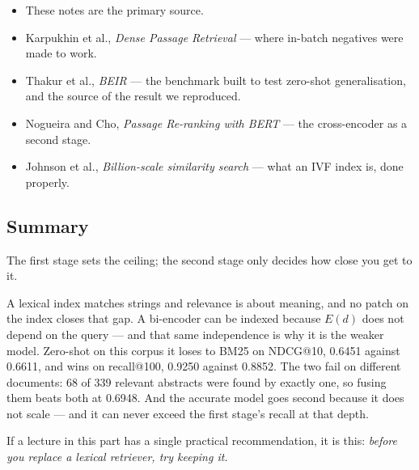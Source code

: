 \documentclass[11pt,a4paper]{article}
\begin{document}
\begin{itemize}[leftmargin=*,nosep]
  \item These notes are the primary source.
  \item Karpukhin et al., \emph{Dense Passage Retrieval} --- where in-batch
        negatives were made to work.
  \item Thakur et al., \emph{BEIR} --- the benchmark built to test zero-shot
        generalisation, and the source of the result we reproduced.
  \item Nogueira and Cho, \emph{Passage Re-ranking with BERT} --- the
        cross-encoder as a second stage.
  \item Johnson et al., \emph{Billion-scale similarity search} --- what an IVF
        index is, done properly.
\end{itemize}

\subsection{Summary}

\begin{keybox}[title={One line to keep}]
The first stage sets the ceiling; the second stage only decides how close you
get to it.
\end{keybox}

A lexical index matches strings and relevance is about meaning, and no patch on
the index closes that gap. A bi-encoder can be indexed because $E(d)$ does not
depend on the query --- and that same independence is why it is the weaker
model. Zero-shot on this corpus it loses to BM25 on NDCG@10, 0.6451 against
0.6611, and wins on recall@100, 0.9250 against 0.8852. The two fail on
different documents: 68 of 339 relevant abstracts were found by exactly one, so
fusing them beats both at 0.6948. And the accurate model goes second because it
does not scale --- and it can never exceed the first stage's recall at that
depth.

\medskip

If a lecture in this part has a single practical recommendation, it is this:
\emph{before you replace a lexical retriever, try keeping it.}
\end{document}
